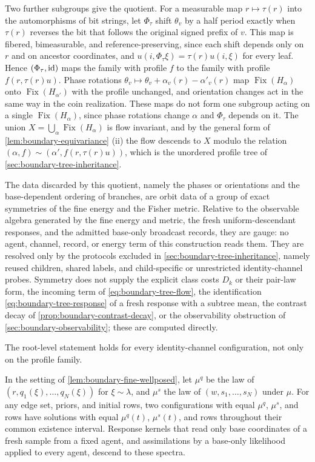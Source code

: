 Two further subgroups give the quotient. For a measurable map $r\mapsto\tau(r)$ into the automorphisms of bit strings, let $\Phi_\tau$ shift $\theta_v$ by a half period exactly when $\tau(r)$ reverses the bit that follows the original signed prefix of $v$. This map is fibered, bimeasurable, and reference-preserving, since each shift depends only on $r$ and on ancestor coordinates, and $u(i,\Phi_\tau\xi)=\tau(r)u(i,\xi)$ for every leaf. Hence $(\Phi_\tau,\mathrm{id})$ maps the family with profile $f$ to the family with profile $f(r,\tau(r)u)$. Phase rotations $\theta_v\mapsto\theta_v+\alpha_v(r)-\alpha'_v(r)$ map $\operatorname{Fix}(H_\alpha)$ onto $\operatorname{Fix}(H_{\alpha'})$ with the profile unchanged, and orientation changes act in the same way in the coin realization. These maps do not form one subgroup acting on a single $\operatorname{Fix}(H_\alpha)$, since phase rotations change $\alpha$ and $\Phi_\tau$ depends on it. The union $X=\bigcup_\alpha\operatorname{Fix}(H_\alpha)$ is flow invariant, and by the general form of \cref{lem:boundary-equivariance} (ii) the flow descends to $X$ modulo the relation $(\alpha,f)\sim(\alpha',f(r,\tau(r)u))$, which is the unordered profile tree of \cref{sec:boundary-tree-inheritance}.

The data discarded by this quotient, namely the phases or orientations and the base-dependent ordering of branches, are orbit data of a group of exact symmetries of the fine energy and the Fisher metric. Relative to the observable algebra generated by the fine energy and metric, the fresh uniform-descendant responses, and the admitted base-only broadcast records, they are gauge: no agent, channel, record, or energy term of this construction reads them. They are resolved only by the protocols excluded in \cref{sec:boundary-tree-inheritance}, namely reused children, shared labels, and child-specific or unrestricted identity-channel probes. Symmetry does not supply the explicit class costs $D_k$ or their pair-law form, the incoming term of \cref{eq:boundary-tree-flow}, the identification \cref{eq:boundary-tree-response} of a fresh response with a subtree mean, the contrast decay of \cref{prop:boundary-contrast-decay}, or the observability obstruction of \cref{sec:boundary-observability}; these are computed directly.

The root-level statement holds for every identity-channel configuration, not only on the profile family.

In the setting of \cref{lem:boundary-fine-wellposed}, let $\mu^q$ be the law of $(r,q_1(\xi),\ldots,q_N(\xi))$ for $\xi\sim\lambda$, and $\mu^s$ the law of $(w,s_1,\ldots,s_N)$ under $\mu$. For any edge set, priors, and initial rows, two configurations with equal $\mu^q$, $\mu^s$, and rows have solutions with equal $\mu^q(t)$, $\mu^s(t)$, and rows throughout their common existence interval. Response kernels that read only base coordinates of a fresh sample from a fixed agent, and assimilations by a base-only likelihood applied to every agent, descend to these spectra.

